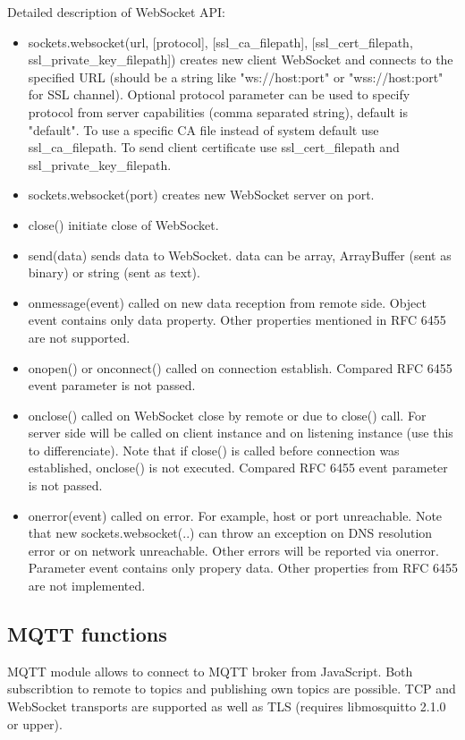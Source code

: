 Detailed description of WebSocket API:
\begin{itemize}
\item sockets.websocket(url, [protocol], [ssl\_ca\_filepath], [ssl\_cert\_filepath, 
ssl\_private\_key\_filepath]) creates new client WebSocket and connects to the 
specified URL (should be a string like "ws://host:port" or "wss://host:port" for 
SSL channel). Optional protocol parameter can be used to specify protocol from server 
capabilities (comma separated string), default is "default". To use a specific CA file 
instead of system default use ssl\_ca\_filepath. To send client certificate use  ssl\_cert\_filepath and ssl\_private\_key\_filepath.
\item sockets.websocket(port) creates new WebSocket server on port.
\item close() initiate close of WebSocket.
\item send(data) sends data to WebSocket. data can be array, ArrayBuffer (sent as binary) or string (sent as text).
\item onmessage(event) called on new data reception from remote side. Object event contains only data property. Other properties mentioned in RFC 6455 are not supported.
\item onopen() or onconnect() called on connection establish. Compared RFC 6455 event parameter is not passed.
\item onclose() called on WebSocket close by remote or due to close() call. For server side will be called on client instance and on listening instance (use this to differenciate). Note that if close() is called before connection was established, onclose() is not executed. Compared RFC 6455 event parameter is not passed.
\item onerror(event) called on error. For example, host or port unreachable. Note that new sockets.websocket(..) can throw an exception on DNS resolution error or on network unreachable. Other errors will be reported via onerror. Parameter event contains only propery data. Other properties from RFC 6455 are not implemented.
\end{itemize}

\subsection{MQTT functions}

MQTT module allows to connect to MQTT broker from JavaScript.
Both subscribtion to remote to topics and publishing own topics are possible.
TCP and WebSocket transports are supported as well as TLS (requires libmosquitto 2.1.0 or upper).

